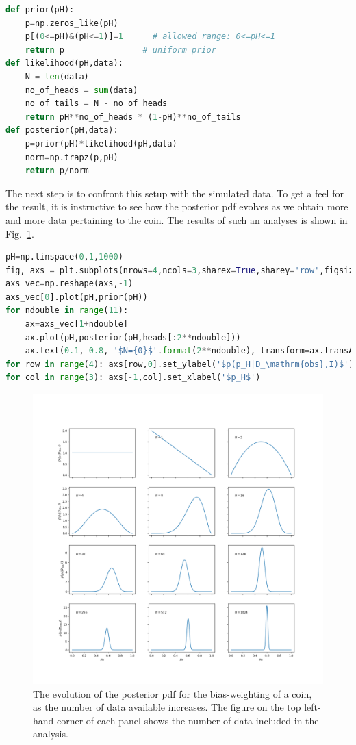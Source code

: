 \documentclass[%
oneside,                 %
final,                   %
10pt]{article}
\begin{document}
\begin{lstlisting}[language=Python,style=blue1]
def prior(pH):
    p=np.zeros_like(pH)
    p[(0<=pH)&(pH<=1)]=1      # allowed range: 0<=pH<=1
    return p                # uniform prior
def likelihood(pH,data):
    N = len(data)
    no_of_heads = sum(data)
    no_of_tails = N - no_of_heads
    return pH**no_of_heads * (1-pH)**no_of_tails
def posterior(pH,data):
    p=prior(pH)*likelihood(pH,data)
    norm=np.trapz(p,pH)
    return p/norm
\end{lstlisting}

The next step is to confront this setup with the simulated data. To get a feel for the result, it is instructive to see how the posterior pdf evolves as we obtain more and more data pertaining to the coin. The results of such an analyses is shown in Fig.~\ref{fig:coinflipping}. 

\begin{lstlisting}[language=Python,style=blue1]
pH=np.linspace(0,1,1000)
fig, axs = plt.subplots(nrows=4,ncols=3,sharex=True,sharey='row',figsize=(14,14))
axs_vec=np.reshape(axs,-1)
axs_vec[0].plot(pH,prior(pH))
for ndouble in range(11):
    ax=axs_vec[1+ndouble]
    ax.plot(pH,posterior(pH,heads[:2**ndouble]))
    ax.text(0.1, 0.8, '$N={0}$'.format(2**ndouble), transform=ax.transAxes)
for row in range(4): axs[row,0].set_ylabel('$p(p_H|D_\mathrm{obs},I)$')
for col in range(3): axs[-1,col].set_xlabel('$p_H$')
\end{lstlisting}


\begin{figure}[!ht]  %
  \centerline{\includegraphics[width=0.95\linewidth]{fig/coinflipping_fig_1.png}}
  \caption{
  The evolution of the posterior pdf for the bias-weighting of a coin, as the number of data available increases. The figure on the top left-hand corner of each panel shows the number of data included in the analysis. \label{fig:coinflipping}
  }
\end{figure}
\end{document}
